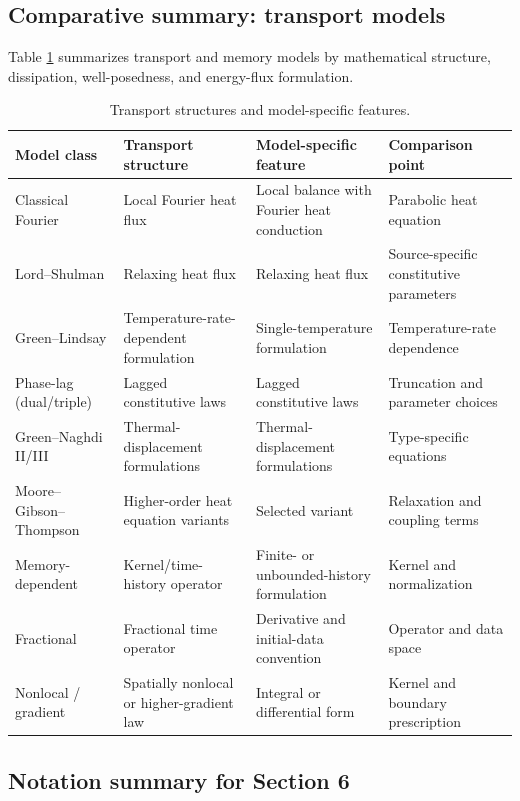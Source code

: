 \subsection{Comparative summary: transport models}

Table \ref{tab:transport_comparison} summarizes transport and memory models by mathematical structure, dissipation, well-posedness, and energy-flux formulation.

\begin{table}[htbp]
\centering
\small
\caption{Transport structures and model-specific features.}
\label{tab:transport_comparison}
\begin{tabularx}{\textwidth}{@{}p{2.4cm}XXX@{}}
\toprule
\textbf{Model class} & \textbf{Transport structure} & \textbf{Model-specific feature} & \textbf{Comparison point} \\
\midrule
Classical Fourier & Local Fourier heat flux & Local balance with Fourier heat conduction & Parabolic heat equation \\
Lord--Shulman & Relaxing heat flux & Relaxing heat flux & Source-specific constitutive parameters \\
Green--Lindsay & Temperature-rate-dependent formulation & Single-temperature formulation & Temperature-rate dependence \\
Phase-lag (dual/triple) & Lagged constitutive laws & Lagged constitutive laws & Truncation and parameter choices \\
Green--Naghdi II/III & Thermal-displacement formulations & Thermal-displacement formulations & Type-specific equations \\
Moore--Gibson--Thompson & Higher-order heat equation variants & Selected variant & Relaxation and coupling terms \\
Memory-dependent & Kernel/time-history operator & Finite- or unbounded-history formulation & Kernel and normalization \\
Fractional & Fractional time operator & Derivative and initial-data convention & Operator and data space \\
Nonlocal / gradient & Spatially nonlocal or higher-gradient law & Integral or differential form & Kernel and boundary prescription \\
\bottomrule
\end{tabularx}
\end{table}

\subsection{Notation summary for Section 6}

